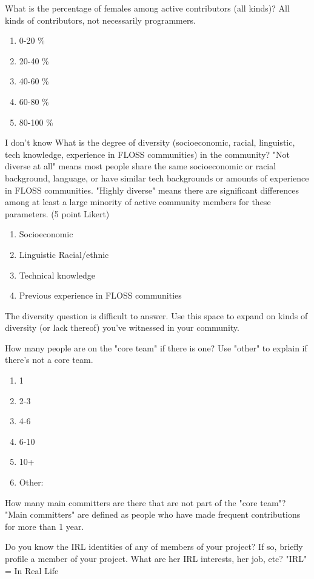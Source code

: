\begin{table}
What is the percentage of females among active contributors (all kinds)? All kinds of contributors, not necessarily programmers.

\begin{enumerate}
\item  0-20 \%
\item 20-40 \%
\item 40-60 \%
\item 60-80 \%
\item 80-100 \%
\end{enumerate}

I don't know What is the degree of diversity (socioeconomic, racial, linguistic, tech knowledge, experience in FLOSS communities) in the community? "Not diverse at all" means most people share the same socioeconomic or racial background, language, or have similar tech backgrounds or amounts of experience in FLOSS communities. "Highly diverse" means there are significant differences among at least a large minority of active community members for these parameters. (5 point Likert)

\begin{enumerate}
\item Socioeconomic
\item Linguistic Racial/ethnic
\item Technical knowledge
\item Previous experience in FLOSS communities
\end{enumerate}

The diversity question is difficult to answer. Use this space to expand on kinds of diversity (or lack thereof) you've witnessed in your community.

How many people are on the "core team" if there is one? Use "other" to explain if there's not a core team.
\begin{enumerate}
\item 1
\item 2-3
\item 4-6
\item 6-10
\item 10+
\item Other:
\end{enumerate}

How many main committers are there that are not part of the "core team"? "Main committers" are defined as people who have made frequent contributions for more than 1 year.

Do you know the IRL identities of any of members of your project? If so, briefly profile a member of your project. What are her IRL interests, her job, etc? "IRL" = In Real Life


\end{table}

